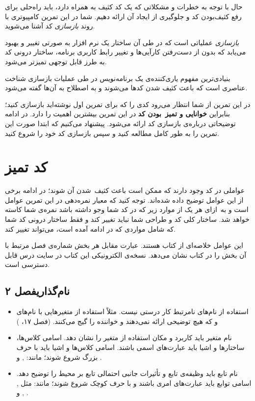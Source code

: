 \documentclass{utap}
\newcommand{\chap}[1]{\hfill\normalfont\normalsize فصل #1}
\begin{document}
حال با توجه به خطرات و مشکلاتی که یک کد کثیف به همراه دارد، باید راه‌حلی برای رفع کثیف‌بودن کد و جلو‌‌گیری از ایجاد آن ارائه دهیم. شما در این تمرین کامپیوتری با روند \textit{بازسازی} کد آشنا می‌شوید.

\textit{بازسازی} عملیاتی است که در طی آن ساختار یک نرم افزار به صورتی تغییر و بهبود می‌یابد که بدون از دست‌رفتن کارآیی‌ها و تغییر رابط کاربری برنامه، ساختار درونی کد به طرز قابل توجهی تمیزتر می‌شود.

بنیادی‌ترین مفهوم یاری‌کننده‌ی یک برنامه‌نویس در طی عملیات بازسازی شناخت عناصری است که باعث کثیف شدن کدها می‌شوند و به اصطلاح به آن‌ها  گفته می‌شود.

در این تمرین از شما انتظار می‌رود کدی را که برای تمرین اول نوشته‌اید بازسازی کنید؛ بنابراین \textbf{خوانایی و تمیز~بودن کد} در این تمرین بیشترین اهمیت را دارد. در ادامه توضیحاتی درباره‌ی بازسازی کد ارائه می‌شود. پیشنهاد می‌کنیم که ابتدا صورت این تمرین را به طور کامل مطالعه کنید و سپس بازسازی کد خود را شروع کنید.

\section{کد تمیز}
عواملی در کد وجود دارند که ممکن است باعث کثیف~شدن آن شوند؛ در ادامه برخی از این عوامل توضیح داده شده‌اند. توجه کنید که معیار نمره‌دهی در این تمرین عوامل است و به~ازای هر یک از موارد زیر که در کد شما وجو داشته باشد نمره‌ی شما کاسته خواهد شد. ساختار کلی کد و طراحی شما نباید تغییر کند و فقط ساختار درونی کد شما که شامل مواردی که در ادامه آمده است، می‌تواند تغییر کند.

این عوامل خلاصه‌ای از کتاب  هستند. عبارت مقابل هر بخش شماره‌ی فصل مرتبط با آن بخش را در کتاب نشان می‌دهد.
نسخه‌ی الکترونیکی این کتاب در سایت درس قابل دسترسی است.

\subsection[نام‌گذاری]{نام‌گذاری\chap{۲}}
\begin{itemize}
    \item
استفاده از نام‌های نامرتبط کار درستی نیست. مثلاً استفاده از متغیر‌هایی با نام‌های  و  که هیچ توضیحی ارائه نمی‌دهند و خواننده را گیج می‌کنند. (فصل ۱۷، )
    \item
نام متغیر باید کاربرد و مکان استفاده از متغیر را نشان دهد.
اسامی کلاس‌ها، ساختارها و اشیا باید عبارت‌های اسمی باشند. اسامی کلاس‌ها و اشیا باید با حرف بزرگ شروع شوند؛ مانند:  ,  و .
    \item
نام تابع باید وظیفه‌ی تابع و تأثیرات جانبی احتمالی تابع بر محیط را توضیح دهد.
اسامی توابع باید عبارت‌های امری باشند و با حرف کوچک شروع شوند؛ مانند: مثل ,  ,  و .
\end{itemize}
\end{document}
